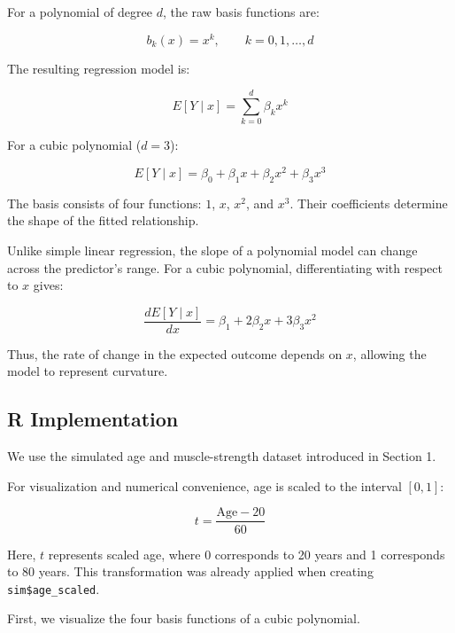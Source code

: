 \documentclass[
  letterpaper,
  DIV=11,
  numbers=noendperiod]{scrreprt}
\begin{document}
For a polynomial of degree \(d\), the raw basis functions are:

\[
b_k(x)=x^k,\qquad k=0,1,\ldots,d
\]

The resulting regression model is:

\[
E[Y\mid x]=\sum_{k=0}^{d}\beta_kx^k
\]

For a cubic polynomial (\(d=3\)):

\[
E[Y\mid x]=\beta_0+\beta_1x+\beta_2x^2+\beta_3x^3
\]

The basis consists of four functions: \(1\), \(x\), \(x^2\), and
\(x^3\). Their coefficients determine the shape of the fitted
relationship.

Unlike simple linear regression, the slope of a polynomial model can
change across the predictor's range. For a cubic polynomial,
differentiating with respect to \(x\) gives:

\[
\frac{dE[Y\mid x]}{dx}
=\beta_1+2\beta_2x+3\beta_3x^2
\]

Thus, the rate of change in the expected outcome depends on \(x\),
allowing the model to represent curvature.

\subsection{R Implementation}\label{r-implementation}

We use the simulated age and muscle-strength dataset introduced in
Section 1.

For visualization and numerical convenience, age is scaled to the
interval \([0,1]\):

\[
t=\frac{\text{Age}-20}{60}
\]

Here, \(t\) represents scaled age, where 0 corresponds to 20 years and 1
corresponds to 80 years. This transformation was already applied when
creating \texttt{sim\$age\_scaled}.

First, we visualize the four basis functions of a cubic polynomial.
\end{document}
